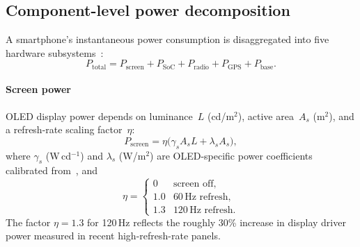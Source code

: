 \documentclass[5p,times,number]{elsarticle}
\begin{document}
\subsection{Component-level power decomposition}\label{sec:power}
A smartphone's instantaneous power consumption is disaggregated into five hardware subsystems~\cite{Carroll2010,Chen2014}:
\begin{equation}\label{eq:ptotal}
P_{\mathrm{total}} = P_{\mathrm{screen}} + P_{\mathrm{SoC}} + P_{\mathrm{radio}} + P_{\mathrm{GPS}} + P_{\mathrm{base}}.
\end{equation}
\paragraph{Screen power}
OLED display power depends on luminance~$L$ (cd/m$^2$), active area~$A_s$ (m$^2$), and a refresh-rate scaling factor~$\eta$:
\begin{equation}\label{eq:screen}
P_{\mathrm{screen}} = \eta\bigl(\gamma_s A_s L + \lambda_s A_s\bigr),
\end{equation}
where $\gamma_s$ (W\,cd$^{-1}$) and $\lambda_s$ (W/m$^{2}$) are OLED-specific power coefficients calibrated from~\cite{Lu2008}, and
\begin{equation}
\eta = \begin{cases} 0 & \text{screen off,} \\ 1.0 & 60\,\text{Hz refresh,} \\ 1.3 & 120\,\text{Hz refresh.} \end{cases}
\end{equation}
The factor $\eta = 1.3$ for 120\,Hz reflects the roughly 30\% increase in display driver power measured in recent high-refresh-rate panels.
\end{document}
